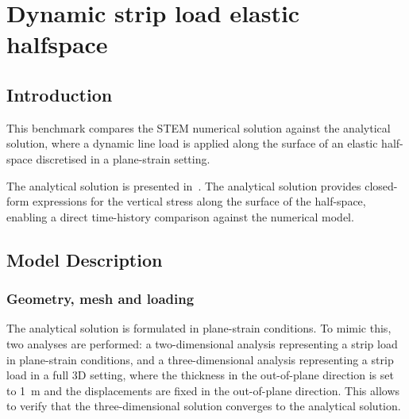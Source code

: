 \chapter{Dynamic strip load elastic halfspace} \label{ch:strip_load_2D}

\section{Introduction}
This benchmark compares the STEM numerical solution against the analytical solution,
where a dynamic line load is applied along the surface of an elastic half-space discretised in a plane-strain setting.

The analytical solution is presented in~\cite{Verruijt_Brinkgreve_Li_2008}.
The analytical solution provides closed-form expressions for the vertical stress along the surface of the
half-space, enabling a direct time-history comparison against the numerical model.

\section{Model Description}

\subsection{Geometry, mesh and loading}
The analytical solution is formulated in plane-strain conditions. To mimic this, two analyses are performed:
a two-dimensional analysis representing a strip load in plane-strain conditions, and a three-dimensional
analysis representing a strip load in a full 3D setting, where the thickness in the out-of-plane direction is set to
\qty{1}{\meter} and the displacements are fixed in the out-of-plane direction. This allows to verify that the
three-dimensional solution converges to the analytical solution.

